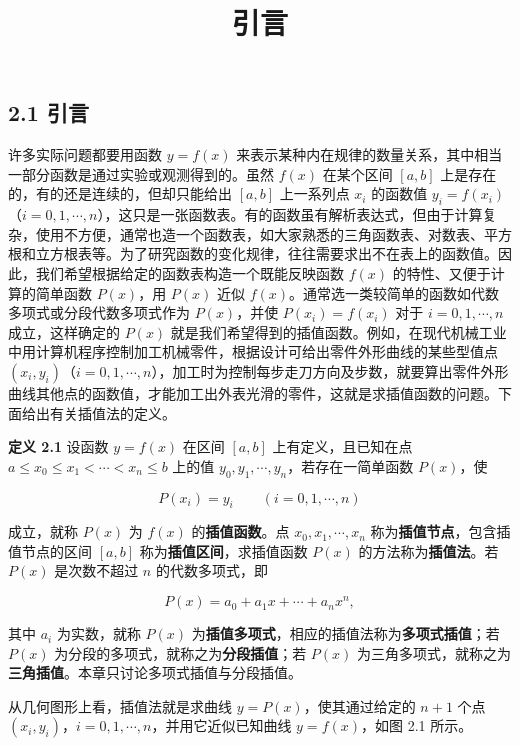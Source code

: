 \documentclass[
  10pt,
  fontset=fandol]{ctexart}
\title{引言}
\author{}
\date{}
\begin{document}
\maketitle

\subsection{2.1 引言}\label{ux5f15ux8a00}

许多实际问题都要用函数 \(y=f(x)\) 来表示某种内在规律的数量关系，其中相当一部分函数是通过实验或观测得到的。虽然 \(f(x)\) 在某个区间 \([a,b]\) 上是存在的，有的还是连续的，但却只能给出 \([a,b]\) 上一系列点 \(x_i\) 的函数值 \(y_i=f(x_i)\)（\(i=0,1,\cdots,n\)），这只是一张函数表。有的函数虽有解析表达式，但由于计算复杂，使用不方便，通常也造一个函数表，如大家熟悉的三角函数表、对数表、平方根和立方根表等。为了研究函数的变化规律，往往需要求出不在表上的函数值。因此，我们希望根据给定的函数表构造一个既能反映函数 \(f(x)\) 的特性、又便于计算的简单函数 \(P(x)\)，用 \(P(x)\) 近似 \(f(x)\)。通常选一类较简单的函数如代数多项式或分段代数多项式作为 \(P(x)\)，并使 \(P(x_i)=f(x_i)\) 对于 \(i=0,1,\cdots,n\) 成立，这样确定的 \(P(x)\) 就是我们希望得到的插值函数。例如，在现代机械工业中用计算机程序控制加工机械零件，根据设计可给出零件外形曲线的某些型值点 \((x_i,y_i)\)（\(i=0,1,\cdots,n\)），加工时为控制每步走刀方向及步数，就要算出零件外形曲线其他点的函数值，才能加工出外表光滑的零件，这就是求插值函数的问题。下面给出有关插值法的定义。

\textbf{定义 2.1} 设函数 \(y=f(x)\) 在区间 \([a,b]\) 上有定义，且已知在点 \(a\le x_0\le x_1<\cdots<x_n\le b\) 上的值 \(y_0,y_1,\cdots,y_n\)，若存在一简单函数 \(P(x)\)，使

\[
P(x_i)=y_i\qquad (i=0,1,\cdots,n)
\tag{2.1.1}
\]

成立，就称 \(P(x)\) 为 \(f(x)\) 的\textbf{插值函数}。点 \(x_0,x_1,\cdots,x_n\) 称为\textbf{插值节点}，包含插值节点的区间 \([a,b]\) 称为\textbf{插值区间}，求插值函数 \(P(x)\) 的方法称为\textbf{插值法}。若 \(P(x)\) 是次数不超过 \(n\) 的代数多项式，即

\[
P(x)=a_0+a_1x+\cdots+a_nx^n,
\tag{2.1.2}
\]

其中 \(a_i\) 为实数，就称 \(P(x)\) 为\textbf{插值多项式}，相应的插值法称为\textbf{多项式插值}；若 \(P(x)\) 为分段的多项式，就称之为\textbf{分段插值}；若 \(P(x)\) 为三角多项式，就称之为\textbf{三角插值}。本章只讨论多项式插值与分段插值。

从几何图形上看，插值法就是求曲线 \(y=P(x)\)，使其通过给定的 \(n+1\) 个点 \((x_i,y_i)\)，\(i=0,1,\cdots,n\)，并用它近似已知曲线 \(y=f(x)\)，如图 2.1 所示。
\end{document}
